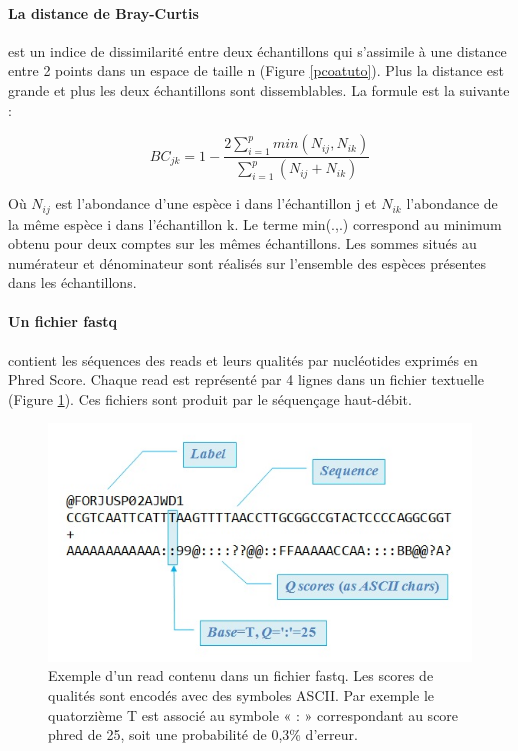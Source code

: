 \documentclass[12pt,a4paper]{article}
\begin{document}
\paragraph{La distance de Bray-Curtis} est un indice de dissimilarité entre deux échantillons qui s'assimile à une distance entre 2 points dans un espace de taille n (Figure \ref{pcoatuto}). Plus la distance est grande et plus les deux échantillons sont dissemblables. La formule est la suivante :

\begin{mycapequ}[!h]
   \begin{equation}
    BC_{jk} = 1 - \frac{2\sum_{i=1}^{p}min(N_{ij},N_{ik})}{\sum_{i=1}^{p}(N_{ij} + N_{ik})}
   \end{equation}
      \caption{Où $N_{ij}$ est l'abondance d'une  espèce i dans l'échantillon j et $N_{ik}$ l'abondance de la même espèce i dans l'échantillon k. Le terme min(.,.) correspond au minimum obtenu pour deux comptes sur les mêmes échantillons. Les sommes situés au numérateur et dénominateur sont réalisés sur l'ensemble des espèces présentes dans les échantillons.}
\end{mycapequ}


\paragraph{Un fichier fastq} contient les séquences des reads et leurs qualités par nucléotides exprimés en Phred Score. Chaque read est représenté par 4 lignes dans un fichier textuelle (Figure \ref{fastq}). Ces fichiers sont produit par le séquençage haut-débit.

\begin{figure}[!h]
\begin{center}
\includegraphics[scale=0.6]{img/fastq.jpg}\hfill
\end{center}
\caption{Exemple d'un read contenu dans un fichier fastq. Les scores de qualités sont encodés avec des symboles ASCII. Par exemple le quatorzième T  est associé au symbole « : » correspondant au score phred de 25, soit une probabilité de 0,3\% d'erreur.}
\label{fastq}
\end{figure}
\end{document}
